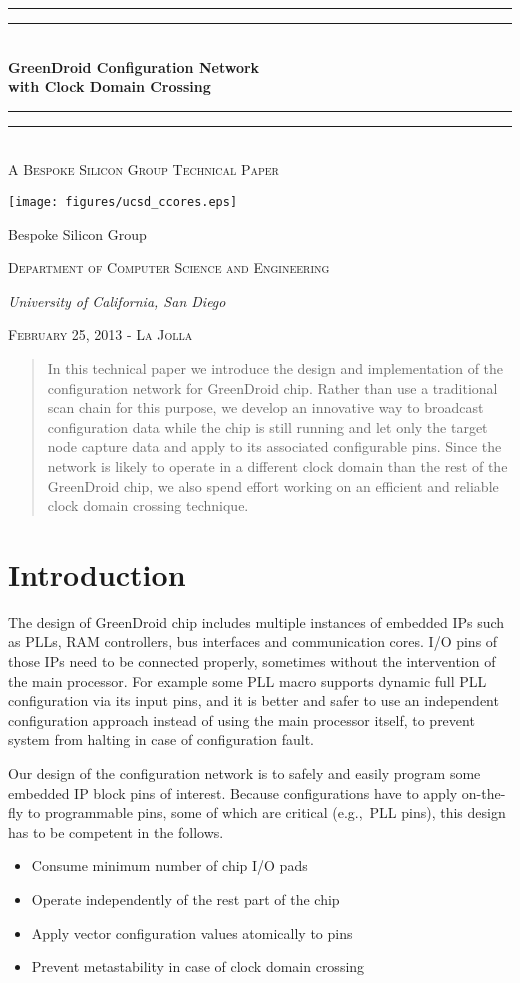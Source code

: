 \documentclass[12pt]{article}
\newcommand{\eg}{e.g.,~}
\newcommand*{\makebsgtitle} {
\begingroup %
  \centering %
  \vspace*{\baselineskip} %

  \rule{\textwidth}{1.6pt}\vspace*{-\baselineskip}\vspace*{2pt} %
  \rule{\textwidth}{0.4pt}\\[\baselineskip] %

  {\LARGE\bfseries GreenDroid Configuration Network \\with Clock Domain Crossing} \\[0.2\baselineskip] %

  \rule{\textwidth}{0.4pt}\vspace*{-\baselineskip}\vspace{3.2pt} %
  \rule{\textwidth}{1.6pt}\\[\baselineskip] %

  \scshape %
  A Bespoke Silicon Group Technical Paper \\[\baselineskip] %

  \vspace*{5\baselineskip} %

  \texttt{[image: figures/ucsd\_ccores.eps]}

  \vspace*{5\baselineskip} %
  {\Large Bespoke Silicon Group \par} %
  {\scshape Department of Computer Science and Engineering \par} %
  {\itshape University of California,  San Diego \par} %

  \vfill %

  {\scshape February 25, 2013 - La Jolla} \\[0.3\baselineskip] %
\endgroup}
\begin{document}
\begin{titlepage}
\makebsgtitle %
\end{titlepage}

\begin{abstract}
In this technical paper we introduce the design and implementation of the
configuration network for GreenDroid chip. Rather than use a traditional scan
chain for this purpose, we develop an innovative way to broadcast configuration
data while the chip is still running and let only the target node capture data
and apply to its associated configurable pins. Since the network is likely to
operate in a different clock domain than the rest of the GreenDroid chip, we
also spend effort working on an efficient and reliable clock domain crossing
technique.
\end{abstract}
\newpage

\tableofcontents %
\newpage

\section{Introduction} \label{intro}
The design of GreenDroid chip includes multiple instances of embedded IPs such
as PLLs, RAM controllers, bus interfaces and communication cores. I/O pins of
those IPs need to be connected properly, sometimes without the intervention of
the main processor. For example some PLL macro supports dynamic full PLL
configuration via its input pins, and it is better and safer to use an
independent configuration approach instead of using the main processor itself,
to prevent system from halting in case of configuration fault.

Our design of the configuration network is to safely and easily program some
embedded IP block pins of interest. Because configurations have to apply
on-the-fly to programmable pins, some of which are critical (\eg PLL pins),
this design has to be competent in the follows.
\begin{itemize}
\item Consume minimum number of chip I/O pads
\item Operate independently of the rest part of the chip
\item Apply vector configuration values atomically to pins
\item Prevent metastability in case of clock domain crossing
\end{itemize}
\end{document}
